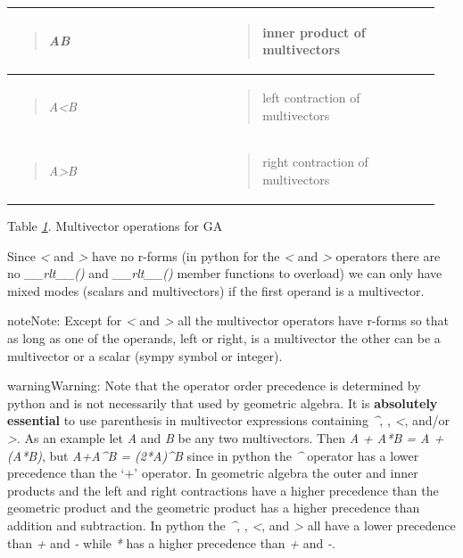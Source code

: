 \documentclass[letterpaper,10pt,english]{sphinxmanual}
\begin{document}
\begin{tabular}{|p{0.475\linewidth}|p{0.475\linewidth}|}
\begin{quote}
\emph{A\textbar{}B}
\end{quote}
 & \begin{quote}

inner product of multivectors
\end{quote}
\\\hline
\begin{quote}

\emph{A\textless{}B}
\end{quote}
 & \begin{quote}

left contraction of multivectors
\end{quote}
\\\hline
\begin{quote}

\emph{A\textgreater{}B}
\end{quote}
 & \begin{quote}

right contraction of multivectors
\end{quote}
\\\hline
\end{tabular}


Table {\hyperref[GA:table1]{\emph{1}}}. Multivector operations for GA

Since \emph{\textless{}} and \emph{\textgreater{}} have no r-forms (in python for the \emph{\textless{}} and \emph{\textgreater{}} operators there are no \emph{\_\_rlt\_\_()} and \emph{\_\_rlt\_\_()} member functions to overload)
we can only have mixed modes (scalars and multivectors) if the first operand is a multivector.

\begin{notice}{note}{Note:}
Except for \emph{\textless{}} and \emph{\textgreater{}} all the multivector operators have r-forms so that as long as one of the
operands, left or right, is a multivector the other can be a multivector or a scalar (sympy symbol or integer).
\end{notice}

\begin{notice}{warning}{Warning:}
Note that the operator order precedence is determined by python and is not
necessarily that used by geometric algebra. It is \textbf{absolutely essential} to
use parenthesis in multivector
expressions containing \emph{\textasciicircum{}}, \emph{\textbar{}}, \emph{\textless{}}, and/or \emph{\textgreater{}}.  As an example let
\emph{A} and \emph{B} be any two multivectors. Then \emph{A + A*B = A +(A*B)}, but
\emph{A+A\textasciicircum{}B = (2*A)\textasciicircum{}B} since in python the \emph{\textasciicircum{}} operator has a lower precedence
than the `+' operator.  In geometric algebra the outer and inner products and
the left and right contractions have a higher precedence than the geometric
product and the geometric product has a higher precedence than addition and
subtraction.  In python the \emph{\textasciicircum{}}, \emph{\textbar{}}, \emph{\textless{}}, and \emph{\textgreater{}} all have a lower
precedence than \emph{+} and \emph{-} while \emph{*} has a higher precedence than
\emph{+} and \emph{-}.
\end{notice}
\end{document}
